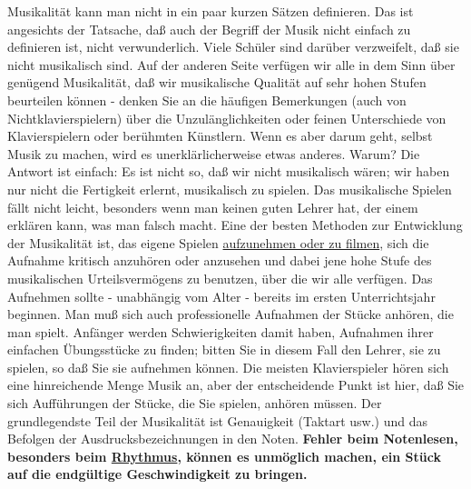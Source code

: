 Musikalität kann man nicht in ein paar kurzen Sätzen definieren.
Das ist angesichts der Tatsache, daß auch der Begriff der Musik nicht einfach zu definieren ist, nicht verwunderlich.
Viele Schüler sind darüber verzweifelt, daß sie nicht musikalisch sind.
Auf der anderen Seite verfügen wir alle in dem Sinn über genügend Musikalität, daß wir musikalische Qualität auf sehr hohen Stufen beurteilen können - denken Sie an die häufigen Bemerkungen (auch von Nichtklavierspielern) über die Unzulänglichkeiten oder feinen Unterschiede von Klavierspielern oder berühmten Künstlern.
Wenn es aber darum geht, selbst Musik zu machen, wird es unerklärlicherweise etwas anderes.
Warum?
Die Antwort ist einfach: Es ist nicht so, daß wir nicht musikalisch wären; wir haben nur nicht die Fertigkeit erlernt, musikalisch zu spielen.
Das musikalische Spielen fällt nicht leicht, besonders wenn man keinen guten Lehrer hat, der einem erklären kann, was man falsch macht.
Eine der besten Methoden zur Entwicklung der Musikalität ist, das eigene Spielen \hyperlink{c1iii13}{aufzunehmen oder zu filmen}, sich die Aufnahme kritisch anzuhören oder anzusehen und dabei jene hohe Stufe des musikalischen Urteilsvermögens zu benutzen, über die wir alle verfügen.
Das Aufnehmen sollte - unabhängig vom Alter - bereits im ersten Unterrichtsjahr beginnen.
Man muß sich auch professionelle Aufnahmen der Stücke anhören, die man spielt.
Anfänger werden Schwierigkeiten damit haben, Aufnahmen ihrer einfachen Übungsstücke zu finden; bitten Sie in diesem Fall den Lehrer, sie zu spielen, so daß Sie sie aufnehmen können.
Die meisten Klavierspieler hören sich eine hinreichende Menge Musik an, aber der entscheidende Punkt ist hier, daß Sie sich Aufführungen der Stücke, die Sie spielen, anhören müssen.
Der grundlegendste Teil der Musikalität ist Genauigkeit (Taktart usw.) und das Befolgen der Ausdrucksbezeichnungen in den Noten.
\textbf{Fehler beim Notenlesen, besonders beim \hyperlink{c1iii1b}{Rhythmus}, können es unmöglich machen, ein Stück auf die endgültige Geschwindigkeit zu bringen.}

